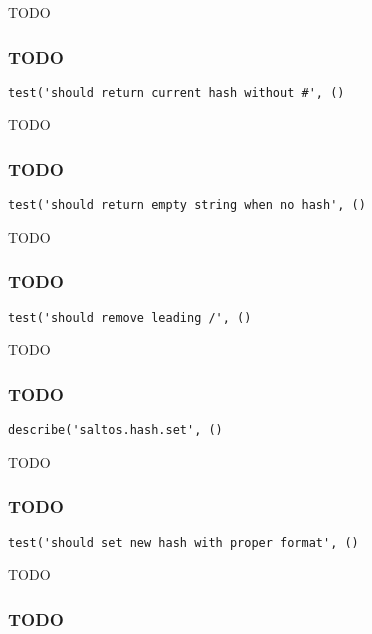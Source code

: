 \documentclass[a4paper]{article}
\begin{document}
TODO

\hypertarget{toc638}{}
\subsubsection{TODO}

\begin{lstlisting}
test('should return current hash without #', ()
\end{lstlisting}

TODO

\hypertarget{toc639}{}
\subsubsection{TODO}

\begin{lstlisting}
test('should return empty string when no hash', ()
\end{lstlisting}

TODO

\hypertarget{toc640}{}
\subsubsection{TODO}

\begin{lstlisting}
test('should remove leading /', ()
\end{lstlisting}

TODO

\hypertarget{toc641}{}
\subsubsection{TODO}

\begin{lstlisting}
describe('saltos.hash.set', ()
\end{lstlisting}

TODO

\hypertarget{toc642}{}
\subsubsection{TODO}

\begin{lstlisting}
test('should set new hash with proper format', ()
\end{lstlisting}

TODO

\hypertarget{toc643}{}
\subsubsection{TODO}
\end{document}
